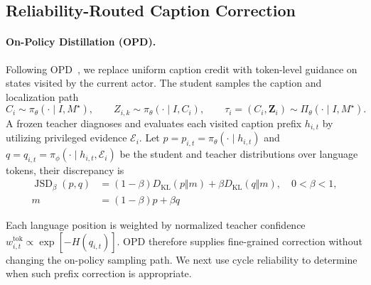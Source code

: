 \documentclass{article}
\begin{document}
\subsection{Reliability-Routed Caption Correction}\label{sec:routed-caption}

\paragraph{On-Policy Distillation (OPD).}
Following OPD~\citep{agarwal2024gkd}, we replace uniform caption credit with token-level guidance on states visited by the current actor. The student samples the caption and localization path
\begin{equation}\label{eq:cycle-trajectory}
 C_i\sim\pi_\theta(\cdot\mid I,M^\star),\qquad
 Z_{i,k}\sim\pi_\theta(\cdot\mid I,C_i),\qquad
 \tau_i=(C_i,\mathbf Z_i)\sim\Pi_\theta(\cdot\mid I,M^\star).
\end{equation}
A frozen teacher diagnoses and evaluates each visited caption prefix $h_{i,t}$ by utilizing privileged evidence $\mathcal E_i$. Let $p=p_{i,t}=\pi_\theta(\cdot\mid h_{i,t})$ and $q=q_{i,t}=\pi_\phi(\cdot\mid h_{i,t},\mathcal E_i)$ be the student and teacher distributions over language tokens, their discrepancy is
\begin{equation}\label{eq:generalized-jsd}
\begin{aligned}
 \operatorname{JSD}_{\beta}(p,q)&=(1-\beta)D_{\mathrm{KL}}(p\Vert m)+\beta D_{\mathrm{KL}}(q\Vert m),\quad 0<\beta<1,\\
 m&=(1-\beta)p+\beta q
\end{aligned}
\end{equation}

Each language position is weighted by normalized teacher confidence $w_{i,t}^{\mathrm{tok}}\propto\exp[-H(q_{i,t})]$. OPD therefore supplies fine-grained correction without changing the on-policy sampling path. We next use cycle reliability to determine when such prefix correction is appropriate.
\end{document}
